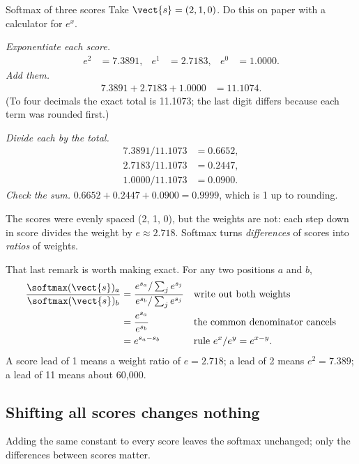 \begin{worked}[label={we:attention:softmax}]{Softmax of three scores}
Take $\vect{s} = (2, 1, 0)$. Do this on paper with a calculator for $e^x$.

\emph{Exponentiate each score.}
\begin{align*}
  e^{2} &= 7.3891, & e^{1} &= 2.7183, & e^{0} &= 1.0000 .
\end{align*}
\emph{Add them.}
\begin{align*}
  7.3891 + 2.7183 + 1.0000 &= 11.1074 .
\end{align*}
(To four decimals the exact total is 11.1073; the last digit differs because each term was
rounded first.)

\emph{Divide each by the total.}
\begin{align*}
  7.3891 / 11.1073 &= 0.6652,\\
  2.7183 / 11.1073 &= 0.2447,\\
  1.0000 / 11.1073 &= 0.0900.
\end{align*}
\emph{Check the sum.} $0.6652 + 0.2447 + 0.0900 = 0.9999$, which is 1 up to rounding.

The scores were evenly spaced (2, 1, 0), but the weights are not: each step down in score
divides the weight by $e \approx 2.718$. Softmax turns \emph{differences} of scores into
\emph{ratios} of weights.
\end{worked}

That last remark is worth making exact. For any two positions $a$ and $b$,
\begin{align}
  \frac{\softmax(\vect{s})_a}{\softmax(\vect{s})_b}
  &= \frac{e^{s_a} / \sum_j e^{s_j}}{e^{s_b} / \sum_j e^{s_j}}
  && \text{write out both weights} \notag\\
  &= \frac{e^{s_a}}{e^{s_b}} && \text{the common denominator cancels} \notag\\
  &= e^{s_a - s_b} && \text{rule } e^{x}/e^{y} = e^{x-y}. \label{eq:attention:ratio}
\end{align}
A score lead of 1 means a weight ratio of $e = 2.718$; a lead of 2 means $e^2 = 7.389$; a lead of
11 means about 60{,}000.

\subsection{Shifting all scores changes nothing}\label{sec:attention:shift}

\begin{keypoint}
Adding the same constant to every score leaves the softmax unchanged; only the differences
between scores matter.
\end{keypoint}

